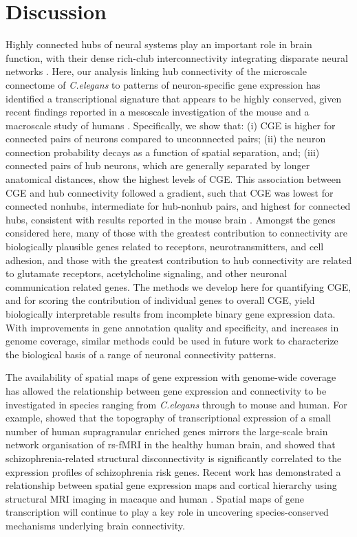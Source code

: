 {\section{Discussion}
Highly connected hubs of neural systems play an important role in brain function, with their dense rich-club interconnectivity integrating disparate neural networks \citep{VandenHeuvel2013b, Fornito2015, DeReus2013b, VandenHeuvel2013a}.
Here, our analysis linking hub connectivity of the microscale connectome of \emph{C.elegans} to patterns of neuron-specific gene expression has identified a transcriptional signature that appears to be highly conserved, given recent findings reported in a mesoscale investigation of the mouse \citep{Fulcher2016} and a macroscale study of humans \citep{Vertes2016b}.
Specifically, we show that:
(i) CGE is higher for connected pairs of neurons compared to unconnnected pairs;
(ii) the neuron connection probability decays as a function of spatial separation, and;
(iii) connected pairs of hub neurons, which are generally separated by longer anatomical distances, show the highest levels of CGE.
This association between CGE and hub connectivity followed a gradient, such that CGE was lowest for connected nonhubs, intermediate for hub-nonhub pairs, and highest for connected hubs, consistent with results reported in the mouse brain \citep{Fulcher2016}.
Amongst the genes considered here, many of those with the greatest contribution to connectivity are biologically plausible genes related to receptors, neurotransmitters, and cell adhesion, and those with the greatest contribution to hub connectivity are related to glutamate receptors, acetylcholine signaling, and other neuronal communication related genes.
The methods we develop here for quantifying CGE, and for scoring the contribution of individual genes to overall CGE, yield biologically interpretable results from incomplete binary gene expression data.
With improvements in gene annotation quality and specificity, and increases in genome coverage, similar methods could be used in future work to characterize the biological basis of a range of neuronal connectivity patterns.

The availability of spatial maps of gene expression with genome-wide coverage has allowed the relationship between gene expression and connectivity to be investigated in species ranging from \textit{C.elegans} through to mouse and human.
For example, \citet{Krienen2016} showed that the topography of transcriptional expression of a small number of human supragranular enriched genes mirrors the large-scale brain network organisation of rs-fMRI in the healthy human brain, and \citet{Romme2017} showed that schizophrenia-related structural disconnectivity is significantly correlated to the expression profiles of schizophrenia risk genes.
Recent work has demonstrated a relationship between spatial gene expression maps and cortical hierarchy using structural MRI imaging in macaque and human \citep{Burt2018}.
Spatial maps of gene transcription will continue to play a key role in uncovering species-conserved mechanisms underlying brain connectivity.

}
